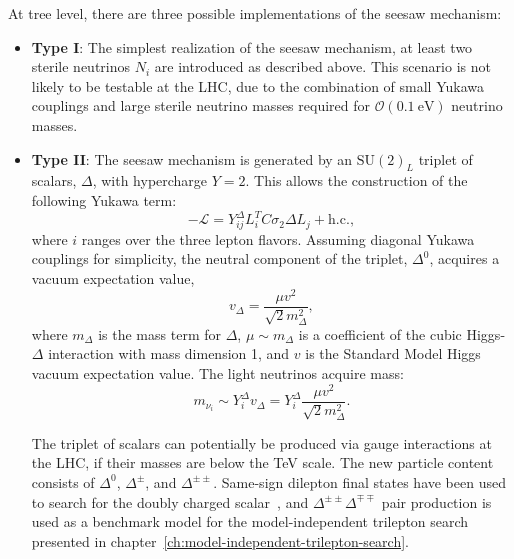 At tree level, there are three possible implementations of the seesaw mechanism: 
\begin{itemize}
	\item \textbf{Type I}: The simplest realization of the seesaw mechanism, at least two sterile neutrinos $N_i$ are introduced as described above. This scenario is not likely to be testable at the LHC, due to the combination of small Yukawa couplings and large sterile neutrino masses required for $\mathcal{O}(0.1~\mbox{eV})$ neutrino masses. 

	\item \textbf{Type II}: The seesaw mechanism is generated by an $\mathrm{SU}(2)_L$ triplet of scalars, $\Delta$, with hypercharge $Y=2$. This allows the construction of the following Yukawa term:
	\begin{equation}
		-\mathcal{L} = Y^{\Delta}_{ij} L_{i}^T C \sigma_2 \Delta L_{j} + \mathrm{h.c.},
	\end{equation}
	where $i$ ranges over the three lepton flavors.  Assuming diagonal Yukawa couplings for simplicity, the neutral component of the triplet, $\Delta^0$, acquires a vacuum expectation value,
	\begin{equation}
		v_{\Delta} = \frac{\mu v^2}{\sqrt{2} m_{\Delta}^2},
	\end{equation}
	where $m_{\Delta}$ is the mass term for $\Delta$, $\mu\sim m_{\Delta}$ is a coefficient of the cubic Higgs-$\Delta$ interaction with mass dimension 1, and $v$ is the Standard Model Higgs vacuum expectation value. The light neutrinos acquire mass:
	\begin{equation}
		m_{\nu_{i}} \sim Y^{\Delta}_{i} v_{\Delta}=Y^{\Delta}_{i} \frac{\mu v^2}{\sqrt{2} m_{\Delta}^2}.
	\end{equation}

	The triplet of scalars can potentially be produced via gauge interactions at the LHC, if their masses are below the TeV scale. The new particle content consists of $\Delta^0$, $\Delta^{\pm}$, and $\Delta^{\pm\pm}$. Same-sign dilepton final states have been used to search for the doubly charged scalar~\cite{TheATLASCollaboration:2015gu}, and $\Delta^{\pm\pm}\Delta^{\mp\mp}$ pair production is used as a benchmark model for the model-independent trilepton search presented in chapter~\ref{ch:model-independent-trilepton-search}. 



\end{itemize}
